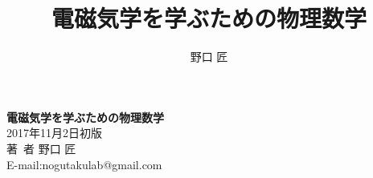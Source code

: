 \documentclass[dvipdfmx,a5j,10pt]{jsbook} %
\renewcommand{\theequation}
  {\arabic{chapter}.\arabic{section}.\arabic{equation}}
\begin{document}
\begin{titlepage}
\title{電磁気学を学ぶための物理数学}
\date{}
\author{野口 匠}
\maketitle
\thispagestyle{empty}
\end{titlepage}
\frontmatter %
\tableofcontents %
\mainmatter %
\appendix %
\makeatletter
  \renewcommand{\theequation}
  {\Alph{chapter}.\arabic{section}.\arabic{equation}}
 \makeatother
\backmatter %
\printindex[nidx]
\printindex[widx]
\newpage
\thispagestyle{empty}
\vspace*{35zw}
\Large{\textbf{電磁気学を学ぶための物理数学}} \\
\small{2017年11月2日\;初版}\\
\normalsize{著\ 者 \; 野口 匠}\\
\normalsize{E-mail:nogutakulab@gmail.com} \\
\end{document}
